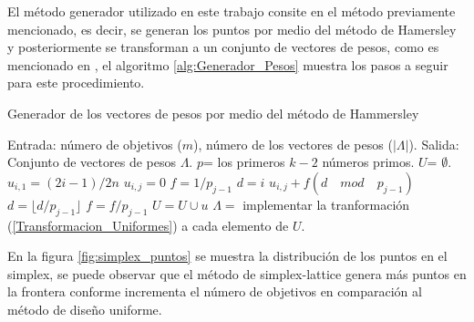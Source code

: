 El método generador utilizado en este trabajo consite en el método previamente mencionado, es decir, se generan los puntos por medio del método de Hamersley y posteriormente se transforman a un conjunto de vectores de pesos, como es mencionado en \cite{berengueroptimizacion}, el algoritmo \ref{alg:Generador_Pesos} muestra los pasos a seguir para este procedimiento.
%

%
 \begin{algorithm}[!t]
\caption{Generador de los vectores de pesos por medio del método de Hammersley}
\label{alg:Generador_Pesos}
\begin{algorithmic}[1]
    \STATE Entrada: número de objetivos ($m$), número de los vectores de pesos ($|\Lambda|$).
    \STATE Salida: Conjunto de vectores de pesos $\Lambda$.
    \STATE $p$= los primeros $k-2$ números primos.
    \STATE $U$= $\emptyset$.
        \STATE $u_{i,1} = (2i - 1)/2n$
	   \STATE $u_{i,j} = 0$
	   \STATE $f = 1/p_{j-1}$
	   \STATE $d = i$
		\STATE $u_{i,j} + f  ( d \quad mod \quad p_{j-1})$
		\STATE $d = \lfloor d / p_{j-1} \rfloor$
		\STATE $f =  f/p_{j-1}$
	   \ENDWHILE
	\ENDFOR
	\STATE $U = U \cup u$
    \ENDFOR
    \STATE $\Lambda = $ implementar la tranformación (\ref{Transformacion_Uniformes}) a cada elemento de $U$.
\end{algorithmic}
\end{algorithm}


En la figura \ref{fig:simplex_puntos} se muestra la distribución de los puntos en el simplex, se puede observar que el método de simplex-lattice genera más puntos en la frontera conforme incrementa el número de objetivos en comparación al método de diseño uniforme. 

